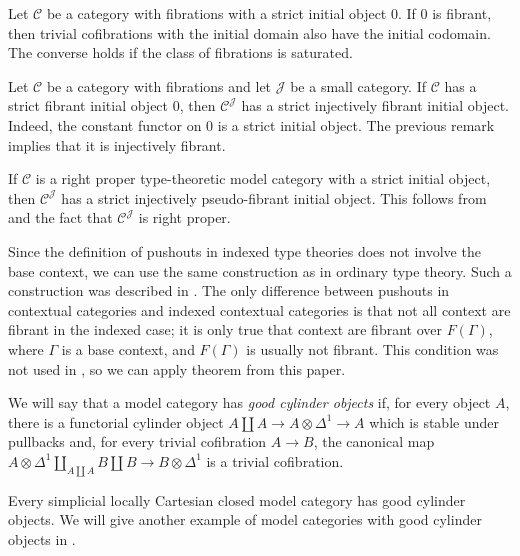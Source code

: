 \documentclass[reqno]{amsart}
\theoremstyle{definition}
\theoremstyle{remark}
\newcommand{\scat}[1]{\mathcal{#1}}
\numberwithin{figure}{section}
\begin{document}
\begin{remark}
Let $\scat{C}$ be a category with fibrations with a strict initial object $0$.
If $0$ is fibrant, then trivial cofibrations with the initial domain also have the initial codomain.
The converse holds if the class of fibrations is saturated.
\end{remark}

\begin{example}
Let $\scat{C}$ be a category with fibrations and let $\scat{J}$ be a small category.
If $\scat{C}$ has a strict fibrant initial object $0$, then $\scat{C}^\scat{J}$ has a strict injectively fibrant initial object.
Indeed, the constant functor on $0$ is a strict initial object.
The previous remark implies that it is injectively fibrant.
\end{example}

\begin{example}
If $\scat{C}$ is a right proper type-theoretic model category with a strict initial object, then $\scat{C}^\scat{J}$ has a strict injectively pseudo-fibrant initial object.
This follows from  and the fact that $\scat{C}^\scat{J}$ is right proper.
\end{example}

Since the definition of pushouts in indexed type theories does not involve the base context, we can use the same construction as in ordinary type theory.
Such a construction was described in \cite{lum-shul-hits}.
The only difference between pushouts in contextual categories and indexed contextual categories is that not all context are fibrant in the indexed case;
it is only true that context are fibrant over $F(\Gamma)$, where $\Gamma$ is a base context, and $F(\Gamma)$ is usually not fibrant.
This condition was not used in \cite{lum-shul-hits}, so we can apply theorem from this paper.

\begin{defn}
We will say that a model category has \emph{good cylinder objects} if, for every object $A$, there is a functorial cylinder object $A \amalg A \to A \otimes \Delta^1 \to A$ which is stable under pullbacks and,
for every trivial cofibration $A \to B$, the canonical map $A \otimes \Delta^1 \amalg_{A \amalg A} B \amalg B \to B \otimes \Delta^1$ is a trivial cofibration.
\end{defn}

Every simplicial locally Cartesian closed model category has good cylinder objects.
We will give another example of model categories with good cylinder objects in .
\end{document}

